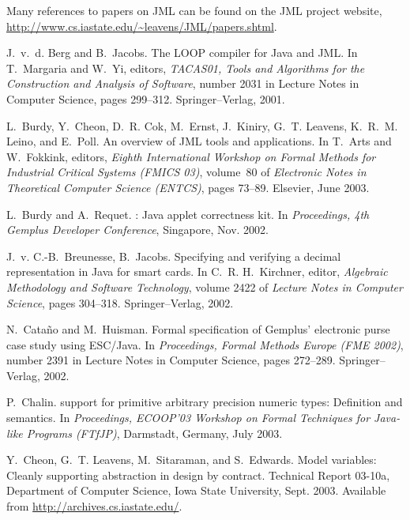 \documentclass{llncs}
\begin{document}
\begin{thebibliography}{10}

Many references to papers on JML can be found on the JML project website,
  \url{http://www.cs.iastate.edu/~leavens/JML/papers.shtml}.

J.~v.~d. Berg and B.~Jacobs.
\newblock The {LOOP} compiler for {Java} and {JML}.
\newblock In T.~Margaria and W.~Yi, editors, {\em {TACAS01}, Tools and
  Algorithms for the Construction and Analysis of Software}, number 2031 in
  Lecture Notes in Computer Science, pages 299--312. Springer--Verlag, 2001.

L.~Burdy, Y.~Cheon, D.~R. Cok, M.~Ernst, J.~Kiniry, G.~T. Leavens, K.~R.~M.
  Leino, and E.~Poll.
\newblock An overview of {JML} tools and applications.
\newblock In T.~Arts and W.~Fokkink, editors, {\em Eighth International
  Workshop on Formal Methods for Industrial Critical Systems (FMICS 03)},
  volume~80 of {\em Electronic Notes in Theoretical Computer Science (ENTCS)},
  pages 73--89. Elsevier, June 2003.

L.~Burdy and A.~Requet.
: Java applet correctness kit.
\newblock In {\em Proceedings, 4th Gemplus Developer Conference}, Singapore,
  Nov. 2002.

J.~v. C.-B.~Breunesse, B.~Jacobs.
\newblock Specifying and verifying a decimal representation in {Java} for smart
  cards.
\newblock In C.~R. H.~Kirchner, editor, {\em Algebraic Methodology and Software
  Technology}, volume 2422 of {\em Lecture Notes in Computer Science}, pages
  304--318. Springer--Verlag, 2002.

N.~Cata{\~n}o and M.~Huisman.
\newblock Formal specification of {Gemplus'} electronic purse case study using
  {ESC/Java}.
\newblock In {\em Proceedings, Formal Methods Europe ({FME} 2002)}, number 2391
  in Lecture Notes in Computer Science, pages 272--289. Springer--Verlag, 2002.

P.~Chalin.
 support for primitive arbitrary precision numeric types:
  Definition and semantics.
\newblock In {\em Proceedings, {ECOOP'03} Workshop on Formal Techniques for
  Java-like Programs ({FTfJP})}, Darmstadt, Germany, July 2003.

Y.~Cheon, G.~T. Leavens, M.~Sitaraman, and S.~Edwards.
\newblock Model variables: Cleanly supporting abstraction in design by
  contract.
\newblock Technical Report 03-10a, Department of Computer Science, Iowa State
  University, Sept. 2003.
\newblock Available from \url{http://archives.cs.iastate.edu/}.


\end{thebibliography}
\end{document}
